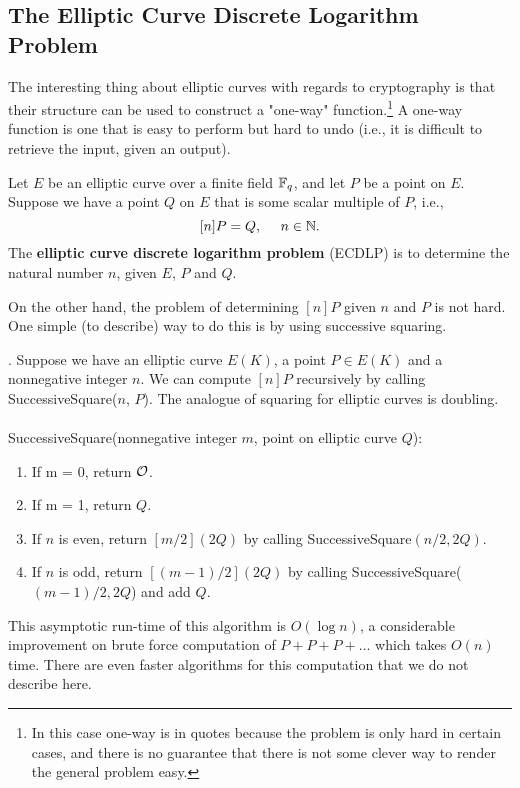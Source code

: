\subsection{The Elliptic Curve Discrete Logarithm Problem}
The interesting thing about elliptic curves with regards to cryptography
is that their structure can be used to construct a "one-way" function.\footnote{In this case one-way is in quotes because the problem is only hard in
certain cases, and there is no guarantee that there is not some clever way to render the
general problem easy.}
 A one-way function is one that is easy to perform but hard to undo (i.e., it is difficult to retrieve the input,
given an output). 
\begin{defn}
Let $E$ be an elliptic curve over a finite field $\mathbb{F}_q$, and let $P$ be a point on $E$. Suppose we have a point $Q$
on $E$ that is some scalar multiple of $P$, i.e.,
$$[n]P = Q, \ \ \ \  n \in \mathbb{N}. $$
The \textbf{elliptic curve discrete logarithm problem} (ECDLP) is to determine the natural number $n$, given $E$, $P$
and $Q$.
\end{defn}

On the other hand, the problem of determining $[n]P$ given $n$ and $P$ is not hard. One simple (to describe)
way to do this is by using successive squaring.

\begin{defn}.
Suppose we have an elliptic curve $E(K)$, a point $P \in E(K)$ and a nonnegative integer $n$.
We can compute $[n]P$ recursively by calling SuccessiveSquare($n$, $P$). The analogue of
squaring for elliptic curves is doubling.\\ \\
SuccessiveSquare(nonnegative integer $m$, point on elliptic curve $Q$): 
\begin{enumerate}
\item
If m = 0, return $\mathcal{O}$.
\item
If m = 1, return $Q$.
\item
If $n$ is even, return $[m/2](2Q)$ by calling SuccessiveSquare$(n / 2, 2Q)$.
\item
If $n$ is odd, return $[(m - 1)/2](2Q)$ by calling SuccessiveSquare( $(m-1) / 2, 2Q$) and add $Q$.
\end{enumerate}
This asymptotic run-time of this algorithm is $O(\log{n})$, a considerable improvement on
brute force computation of $P + P + P + ...$ which takes $O(n)$ time. There are even faster
algorithms for this computation that we do not describe here.
\end{defn}


